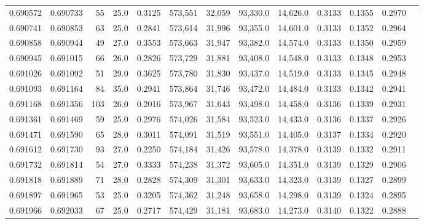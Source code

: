 \begin{tabular}{rrrrrrrrrrrrr}
0.690572 & 0.690733 &    55 & 25.0 &                                     0.3125 & 573,551 &  32,059 &  93,330.0 &  14,626.0 & 0.3133 & 0.1355 & 0.2970 \\
0.690741 & 0.690853 &    63 & 25.0 &                                     0.2841 & 573,614 &  31,996 &  93,355.0 &  14,601.0 & 0.3133 & 0.1352 & 0.2964 \\
0.690858 & 0.690944 &    49 & 27.0 &                                     0.3553 & 573,663 &  31,947 &  93,382.0 &  14,574.0 & 0.3133 & 0.1350 & 0.2959 \\
0.690945 & 0.691015 &    66 & 26.0 &                                     0.2826 & 573,729 &  31,881 &  93,408.0 &  14,548.0 & 0.3133 & 0.1348 & 0.2953 \\
0.691026 & 0.691092 &    51 & 29.0 &                                     0.3625 & 573,780 &  31,830 &  93,437.0 &  14,519.0 & 0.3133 & 0.1345 & 0.2948 \\
0.691093 & 0.691164 &    84 & 35.0 &                                     0.2941 & 573,864 &  31,746 &  93,472.0 &  14,484.0 & 0.3133 & 0.1342 & 0.2941 \\
0.691168 & 0.691356 &   103 & 26.0 &                                     0.2016 & 573,967 &  31,643 &  93,498.0 &  14,458.0 & 0.3136 & 0.1339 & 0.2931 \\
0.691361 & 0.691469 &    59 & 25.0 &                                     0.2976 & 574,026 &  31,584 &  93,523.0 &  14,433.0 & 0.3136 & 0.1337 & 0.2926 \\
0.691471 & 0.691590 &    65 & 28.0 &                                     0.3011 & 574,091 &  31,519 &  93,551.0 &  14,405.0 & 0.3137 & 0.1334 & 0.2920 \\
0.691612 & 0.691730 &    93 & 27.0 &                                     0.2250 & 574,184 &  31,426 &  93,578.0 &  14,378.0 & 0.3139 & 0.1332 & 0.2911 \\
0.691732 & 0.691814 &    54 & 27.0 &                                     0.3333 & 574,238 &  31,372 &  93,605.0 &  14,351.0 & 0.3139 & 0.1329 & 0.2906 \\
0.691818 & 0.691889 &    71 & 28.0 &                                     0.2828 & 574,309 &  31,301 &  93,633.0 &  14,323.0 & 0.3139 & 0.1327 & 0.2899 \\
0.691897 & 0.691965 &    53 & 25.0 &                                     0.3205 & 574,362 &  31,248 &  93,658.0 &  14,298.0 & 0.3139 & 0.1324 & 0.2895 \\
0.691966 & 0.692033 &    67 & 25.0 &                                     0.2717 & 574,429 &  31,181 &  93,683.0 &  14,273.0 & 0.3140 & 0.1322 & 0.2888 \\

\end{tabular}
